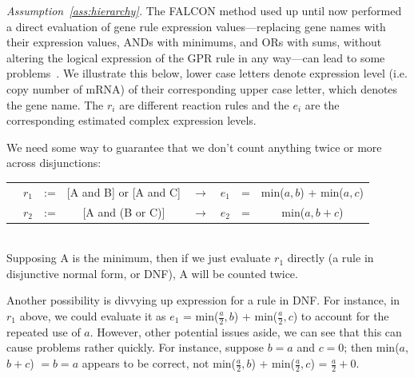 \documentclass[phd,tocprelim]{cornell}
\theoremstyle{break}
\theoremstyle{empty}
\begin{document}
\emph{Assumption~\ref{ass:hierarchy}.}
The FALCON method used up until now performed a direct evaluation of
gene rule expression values---replacing gene names with their
expression values, ANDs with minimums, and ORs with sums, without
altering the logical expression of the GPR rule in any way---can lead
to some problems~\cite{Lee2012}. We illustrate this below, lower case
letters denote expression level (i.e. copy number of mRNA) of their
corresponding upper case letter, which denotes the gene name. The
$r_i$ are different reaction rules and the $e_i$ are the corresponding
estimated complex expression levels.

We need some way to guarantee that we don’t count anything twice or
more across disjunctions: \\
\begin{tabular}{cccccccc}
& $r_1$ & := & [A and B] or [A and C] & $\rightarrow$ & $e_1$  &=& min($a,b$) + min($a,c$) \\ 
& $r_2$ & := & [A and (B or C)]       & $\rightarrow$ & $e_2$  &=&  min($a, b + c$) 
\end{tabular} \\
Supposing A is the minimum, then if we just evaluate $r_1$ directly (a
rule in disjunctive normal form, or DNF), A will be counted twice.

Another possibility is divvying up expression for a rule in DNF. For
instance, in $r_1$ above, we could evaluate it as $e_1$ =
min($\frac{a}{2},b$) + min($\frac{a}{2},c$) to account for the
repeated use of $a$. However, other potential issues aside, we can see
that this can cause problems rather quickly. For instance, suppose $b
= a$ and $c = 0$; then min($a$,$b+c$) $=b=a$ appears to be correct,
not min($\frac{a}{2},b$) + min($\frac{a}{2},c$) = $\frac{a}{2} + 0$.
\end{document}
